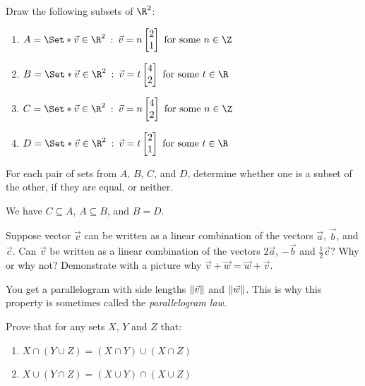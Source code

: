 \begin{exercises}
\begin{problist}
			Draw the following subsets of $\R^2$:
			\begin{enumerate}
				\item $A=\Set*{\vv\in\R^2\given \vv=n\mat{2\\1}
					\text{ for some }n\in\Z}$
				\item $B=\Set*{\vv\in\R^2\given \vv=t\mat{4\\2}\text{ for some }t\in\R}$
				\item $C=\Set*{\vv\in\R^2\given \vv=n\mat{4\\2}
					\text{ for some }n\in\Z}$
				\item $D=\Set*{\vv\in\R^2\given \vv=t\mat{2\\1}\text{ for some }t\in\R}$
			\end{enumerate}
			For each pair of sets from $A$, $B$, $C$, and $D$, determine whether one
			is a subset of the other, if they are equal, or neither.
			\begin{solution}
				We have $C\subseteq A$, $A\subseteq B$, and $B=D$.
			\end{solution}
		\prob
			Suppose vector $\vec v$ can be written as a linear combination of the
			vectors $\vec a$, $\vec b$, and $\vec c$. Can $\vec v$ be written as a
			linear combination of the vectors $2\vec a$, $-\vec b$ and
			$\frac12\vec c$? Why or why not?
		\prob
			Demonstrate with a picture why $\vec v + \vec w = \vec w + \vec v$.
			\begin{solution}
				You get a parallelogram with side lengths $\lVert\vec v\rVert$ and
				$\lVert\vec w\rVert$. This is why this property is sometimes called the
				\emph{parallelogram law}.
			\end{solution}
		\prob
			Prove that for any sets $X$, $Y$ and $Z$ that:
			\begin{enumerate}
				\item $X \cap (Y \cup Z) = (X\cap Y) \cup (X\cap Z)$
				\item $X \cup (Y \cap Z) = (X\cup Y) \cap (X\cup Z)$
			\end{enumerate}
	\end{problist}
\end{exercises}
